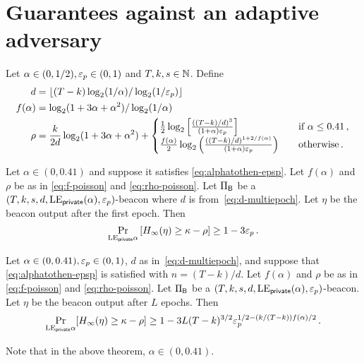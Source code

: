 \section{Guarantees against an adaptive adversary}

Let $\alpha \in (0, 1/2), \mathsf{\varepsilon}_p \in (0, 1)$ and $T, k, s \in \mathbb{N}$.
Define 
\begin{align}
    d &= \lfloor (T - k) \log_2(1/\alpha)/\log_2(1/\mathsf{\varepsilon}_p)\rfloor \label{eq:d-multiepoch}\\
    f(\alpha) &= \log_2(1 + 3 \alpha + \alpha^2)/\log_2(1/\alpha) \label{eq:f-poisson} \\
  \rho &= \frac{k}{2 d} \log_2(1+3\alpha+\alpha^2) + \begin{cases}
     \frac{1}{2} \log_2 \left[ \frac{((T-k)/d)^3}{(1+\alpha) \mathsf{\varepsilon}_p } \right] 
      & \quad\text{if $\alpha \leq 0.41$}\,, \\
     \frac{f(\alpha)}{2} \log_2 \left(\frac{((T-k)/d)^{1 + 2/f(\alpha)} }{(1+\alpha) \mathsf{\varepsilon}_p} \right) 
      &\quad\text{otherwise\,.}\label{eq:rho-poisson}
  \end{cases}
\end{align}


\begin{theorem}\label{thm:beacon-poisson-single-epoch}
  Let $\alpha \in (0, 0.41)$ and suppose it satisfies \eqref{eq:alphatothen-epsp}.
  Let $f(\alpha)$ and $\rho$ be as in \eqref{eq:f-poisson} and \eqref{eq:rho-poisson}.
  Let $\Pi_{\mathsf{B}}$ be a $(T,k,s,d,\mathrm{LE}_\mathsf{private}(\alpha), \mathsf{\varepsilon}_p)$-beacon 
  where $d$ is from~\eqref{eq:d-multiepoch}.
  Let $\eta$ be the beacon output after the first epoch. 
  Then 
  \begin{equation}\label{eq:security-bernoulli-single-epoch}
    \Pr_{\mathrm{LE}_\mathsf{private}{\alpha}}\left[H_\infty(\eta) \geq \kappa - \rho \right] \geq 1 - 3 \mathsf{\varepsilon}_p
    \,.
  \end{equation}
\end{theorem}



\begin{theorem}\label{thm:beacon-poisson-multi-epoch}
  Let $\alpha \in (0, 0.41), \mathsf{\varepsilon}_p \in (0,1)$, 
  $d$ as in~\eqref{eq:d-multiepoch}, 
  and suppose that \eqref{eq:alphatothen-epsp} is satisfied with $n = (T-k)/d$.
  Let $f(\alpha)$ and $\rho$ be as in \eqref{eq:f-poisson} and \eqref{eq:rho-poisson}.
  Let $\Pi_{\mathsf{B}}$ be a $(T,k,s,d,\mathrm{LE}_\mathsf{private}(\alpha), \mathsf{\varepsilon}_p)$-beacon.
  Let $\eta$ be the beacon output after $L$ epochs. 
  Then 
  $$
    \Pr_{\mathrm{LE}_\mathsf{private}{\alpha}}[H_\infty(\eta) \geq \kappa - \rho ] \geq 
      1 - 3 L (T - k)^{3/2} \mathsf{\varepsilon}_p^{1/2 - (k/(T-k)) f(\alpha)/2}
    \,.
  $$
\end{theorem}
\noindent
Note that in the above theorem, $\alpha \in (0, 0.41)$.

